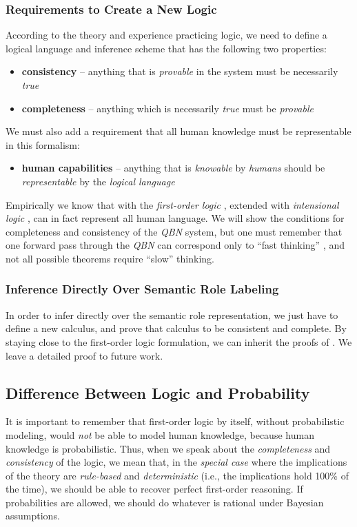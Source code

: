 \documentclass[12pt]{article}
\begin{document}
\subsubsection{Requirements to Create a New Logic}
According to the theory \cite{Godel1931} and experience \cite{pereira1987prolog} practicing logic, we need to define a logical language and inference scheme that has the following two properties:
\begin{itemize}
    \item {\bf consistency} -- anything that is {\em provable} in the system must be necessarily {\em true}
    \item {\bf completeness} -- anything which is necessarily {\em true} must be {\em provable}
\end{itemize}
We must also add a requirement that all human knowledge must be representable in this formalism:
\begin{itemize}
    \item {\bf human capabilities} -- anything that is {\em knowable} by {\em humans} should be {\em representable} by the {\em logical language}
\end{itemize}
Empirically we know that with the {\em first-order logic} \cite{frege_begriffsschrift}, extended with {\em intensional logic} \cite{Montague1970}, can in fact represent all human language.
We will show the conditions for completeness and consistency of the {\em QBN} system, but one must remember that one forward pass through the {\em QBN} can correspond only to ``fast thinking'' \cite{Kahneman2011ThinkingFast}, and not all possible theorems require ``slow'' thinking.

\subsubsection{Inference Directly Over Semantic Role Labeling}
In order to infer directly over the semantic role representation, we just have to define a new calculus, and prove that calculus to be consistent and complete.
By staying close to the first-order logic formulation, we can inherit the proofs of \cite{Godel1931}.
We leave a detailed proof to future work.
\subsection{Difference Between Logic and Probability}
It is important to remember that first-order logic by itself, without probabilistic modeling, would {\em not} be able to model human knowledge, because human knowledge is probabilistic.
Thus, when we speak about the {\em completeness} and {\em consistency} of the logic, we mean that, in the {\em special case} where the implications of the theory are {\em rule-based} and {\em deterministic} (i.e., the implications hold 100\% of the time), we should be able to recover perfect first-order reasoning.
If probabilities are allowed, we should do whatever is rational under Bayesian assumptions.
\end{document}
